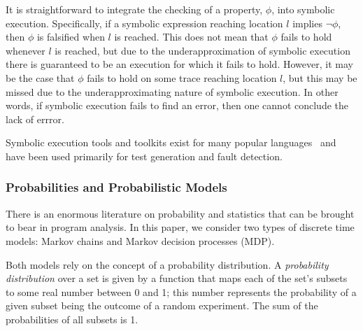 It is straightforward to integrate the checking of a property,
$\phi$, into symbolic execution.  Specifically,
if a symbolic expression reaching location $l$ implies
 $\neg\phi$, then $\phi$ is falsified 
when $l$ is reached.    This does not mean that $\phi$
fails to hold whenever $l$ is reached, but due to the underapproximation
of symbolic execution there is guaranteed to be an execution for which
it fails to hold.
However, it may be the case that $\phi$ fails to hold
on some trace reaching location $l$, but this may be missed
due to the underapproximating nature of symbolic execution.
In other words, if symbolic execution fails to find an error,
then one cannot conclude the lack of errror.

Symbolic execution tools and toolkits exist for many popular 
languages~\cite{pasareanu2010symbolic,godefroid2005dart,jamrozik2013generating,cadar2008klee}
and have been used primarily for test generation and fault detection.

\subsubsection{Probabilities and Probabilistic Models}

There is an enormous literature on probability and statistics
that can be brought to bear in program analysis.  
In this paper, we consider two types of discrete time models:
Markov chains and Markov decision processes (MDP).

Both models rely on the concept of a probability distribution.
A \textit{probability distribution} over a set is given by a function
that maps each of the set's subsets to some real number between 0 and 1;
this number represents the probability of a given subset being the outcome
of a random experiment.
The sum of the probabilities of all subsets is 1.


